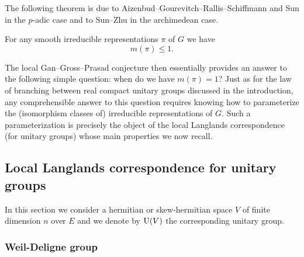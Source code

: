 The following theorem is due to Aizenbud--Gourevitch--Rallis--Schiffmann \cite{aizenbud2010multiplicity} and Sun \cite{sun2012multiplicity} in the $p$-adic case and to Sun--Zhu \cite{sun2012multiplicityarchimedean} in the archimedean case.

\begin{theorem}
For any smooth irreducible representations $\pi$ of $G$ we have
\[m(\pi) \leq 1.\]
\end{theorem}

The local Gan--Gross--Prasad conjecture then essentially provides an answer to the following simple question: when do we have $m(\pi) = 1$? 
Just as for the law of branching between real compact unitary groups discussed in the introduction, any comprehensible answer to this question requires knowing how to parameterize the (isomorphism classes of) irreducible representations of $G$.
Such a parameterization is precisely the object of the local Langlands correspondence (for unitary groups) whose main properties we now recall.


\subsection{Local Langlands correspondence for unitary groups}

In this section we consider a hermitian or skew-hermitian space $V$ of finite dimension $n$ over $E$ and we denote by $\mathrm{U}(V)$ the corresponding unitary group.

\subsubsection{Weil-Deligne group}

